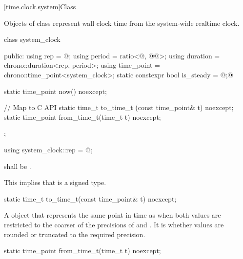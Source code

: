 [time.clock.system]{Class }
%

\pnum
Objects of class  represent wall clock time from the system-wide
realtime clock.

\begin{codeblock}
class system_clock {
public:
  using rep        = @\seebelow@;
  using period     = ratio<@\unspecnc@, @\unspec{}@>;
  using duration   = chrono::duration<rep, period>;
  using time_point = chrono::time_point<system_clock>;
  static constexpr bool is_steady = @\unspec;@

  static time_point now() noexcept;

  // Map to C API
  static time_t      to_time_t  (const time_point& t) noexcept;
  static time_point  from_time_t(time_t t) noexcept;
};
\end{codeblock}

%
\begin{itemdecl}
using system_clock::rep = @\unspec@;
\end{itemdecl}

\begin{itemdescr}
\pnum
\requires {} shall
be .\\
\begin{note} This implies that  is a signed type. \end{note}
\end{itemdescr}

%
\begin{itemdecl}
static time_t to_time_t(const time_point& t) noexcept;
\end{itemdecl}

\begin{itemdescr}
\pnum
\returns A  object that represents the same point in time as 
when both values are restricted to the coarser of the precisions of  and
.
It is 
whether values are rounded or truncated to the required precision.
\end{itemdescr}

%
\begin{itemdecl}
static time_point from_time_t(time_t t) noexcept;
\end{itemdecl}


